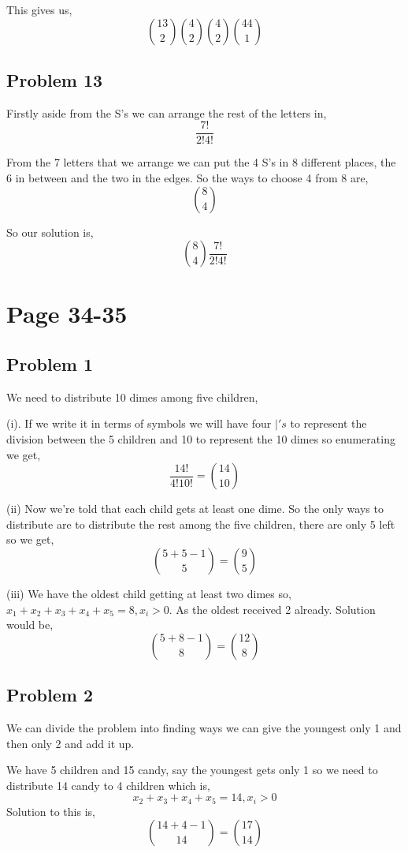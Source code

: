 \documentclass[a4paper]{report}
\begin{document}
This gives us, 
$$ {13 \choose 2}{4 \choose 2}{4 \choose 2}{ 44 \choose 1} $$ 





\subsection*{Problem 13}
Firstly aside from the S's we can arrange the rest of the letters in, 
$$ \frac{7!}{2!4!} $$ 

From the 7 letters that we arrange we can put the 4 S's in 8 different places, the 6 in between and the two in the edges. So the ways to choose 4 from 8 are, 
$$ 8 \choose 4 $$ 

So our solution is, 
$$ {8 \choose 4} \frac{7!}{2!4!} $$ 


\section*{Page 34-35}
\subsection*{Problem 1}
We need to distribute 10 dimes among five children, 

(i). If we write it in terms of symbols we will have four $|'s$ to represent the division between the 5 children and 10 to represent the 10 dimes so enumerating we get, 
$$ \frac{14!}{4!10!} = {14 \choose 10} $$ 

(ii) Now we're told that each child gets at least one dime. So the only ways to distribute are to distribute the rest among the five children, there are only 5 left so we get, 
$$ {5 + 5 - 1 \choose 5}  = {9 \choose 5}$$ 

(iii) We have the oldest child getting at least two dimes so, 
$x_1 + x_2 + x_3 + x_4 + x_5 = 8, x_i > 0$. As the oldest received 2 already. Solution would be, 
$$ {5 + 8 - 1 \choose 8} = {12 \choose 8}$$ 


\subsection*{Problem 2}
We can divide the problem into finding ways we can give the youngest only 1 and then only 2 and add it up.

We have 5 children and 15 candy, say the youngest gets only 1 so we need to distribute 14 candy to 4 children which is,
$$ x_2 + x_3 + x_4 + x_5 = 14, x_i > 0 $$ 
Solution to this is, 
$$ {14 + 4 - 1 \choose 14} = {17 \choose 14} $$ 
\end{document}
